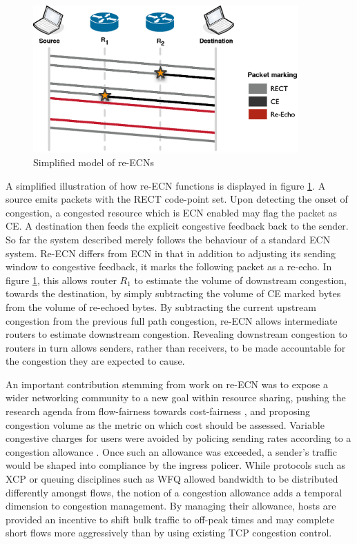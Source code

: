 \begin{figure}
    \centering
    \includegraphics[width=4.0in]{figures/resourcepooling/reecn}
    \caption{Simplified model of re-\acp{ECN}}
    \label{fig:reecn}
\end{figure}

A simplified illustration of how re-\ac{ECN} functions is displayed in figure \ref{fig:reecn}.
A source emits packets with the \ac{RECT} code-point set.
Upon detecting the onset of congestion, a congested resource which is \ac{ECN} enabled may flag the packet as \ac{CE}.
A destination then feeds the explicit congestive feedback back to the sender.
So far the system described merely follows the behaviour of a standard \ac{ECN} system.
Re-\ac{ECN} differs from \ac{ECN} in that in addition to adjusting its sending window to congestive feedback, it marks the following packet as a re-echo.
In figure \ref{fig:reecn}, this allows router $R_1$ to estimate the volume of downstream congestion, towards the destination, by simply subtracting the volume of \ac{CE} marked bytes from the volume of re-echoed bytes.
By subtracting the current upstream congestion from the previous full path congestion, re-{ECN} allows intermediate routers to estimate downstream congestion.
Revealing downstream congestion to routers in turn allows senders, rather than receivers, to be made accountable for the congestion they are expected to cause.

An important contribution stemming from work on re-\ac{ECN} was to expose a wider networking community to a new goal within resource sharing, pushing the research agenda from flow-fairness towards cost-fairness \cite{Briscoe:2007p261}, and proposing congestion volume as the metric on which cost should be assessed.
Variable congestive charges for users were avoided by policing sending rates according to a congestion allowance \cite{Jacquet:2008p341}.
Once such an allowance was exceeded, a sender's traffic would be shaped into compliance by the ingress policer.
While protocols such as \ac{XCP} or queuing disciplines such as \ac{WFQ} allowed bandwidth to be distributed differently amongst flows, the notion of a congestion allowance adds a temporal dimension to congestion management.
By managing their allowance, hosts are provided an incentive to shift bulk traffic to off-peak times and may complete short flows more aggressively than by using existing \ac{TCP} congestion control.

